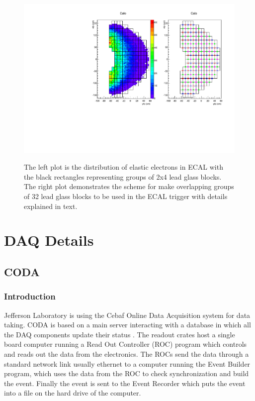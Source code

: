 \documentclass{article}
\begin{document}
\begin{figure}
  \centering
  \includegraphics[width=\textwidth]{figs/cfpa.pdf}\\
  \caption{The left plot is the distribution of elastic electrons in ECAL with the black rectangles representing
groups of 2x4 lead glass blocks. The right plot demonstrates
the scheme for make overlapping groups of 32 lead glass blocks to be used in the ECAL trigger with
details explained in text.  }\label{fig:ECALTrig}
\end{figure}



\section{DAQ Details}
\subsection{CODA}
\subsubsection{Introduction}
Jefferson Laboratory is using the Cebaf Online Data Acquisition system for data taking.
CODA is based on a main server interacting with a database in which all the DAQ components update their status . The readout crates host a single board computer running a Read Out Controller (ROC) program which controls and reads out the data from the electronics. The ROCs send the data through a standard network link usually ethernet to a computer running the Event Builder program, which uses the data from the ROC to check synchronization and build the event. Finally the event is sent to the Event Recorder which puts the event into a file on the hard drive of the computer. 
\end{document}
